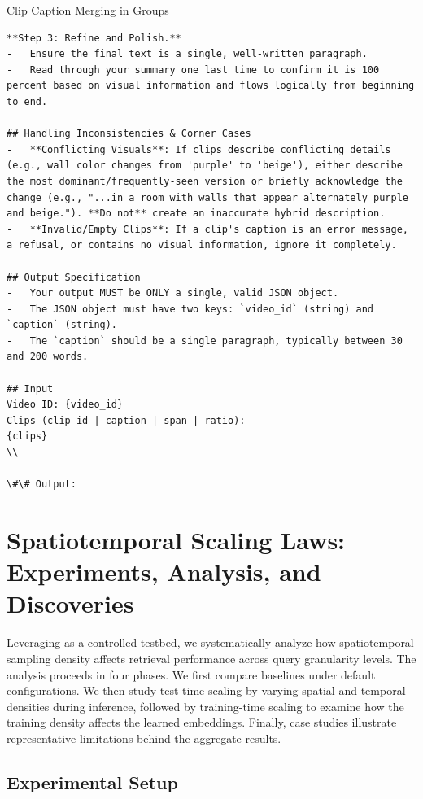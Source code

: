 \begin{promptbox}{Clip Caption Merging in Groups}
\begin{lstlisting}[style=promptstyle]
**Step 3: Refine and Polish.**
-   Ensure the final text is a single, well-written paragraph.
-   Read through your summary one last time to confirm it is 100 percent based on visual information and flows logically from beginning to end.

## Handling Inconsistencies & Corner Cases
-   **Conflicting Visuals**: If clips describe conflicting details (e.g., wall color changes from 'purple' to 'beige'), either describe the most dominant/frequently-seen version or briefly acknowledge the change (e.g., "...in a room with walls that appear alternately purple and beige."). **Do not** create an inaccurate hybrid description.
-   **Invalid/Empty Clips**: If a clip's caption is an error message, a refusal, or contains no visual information, ignore it completely.

## Output Specification
-   Your output MUST be ONLY a single, valid JSON object.
-   The JSON object must have two keys: `video_id` (string) and `caption` (string).
-   The `caption` should be a single paragraph, typically between 30 and 200 words.

## Input
Video ID: {video_id}
Clips (clip_id | caption | span | ratio):
{clips}
\\

\#\# Output:
\end{lstlisting}
\end{promptbox}

\FloatBarrier
\section{Spatiotemporal Scaling Laws: Experiments, Analysis, and Discoveries}
\label{mglvr:sec:scaling}

Leveraging \benchmarkname as a controlled testbed, we systematically analyze how spatiotemporal sampling density affects retrieval performance across query granularity levels. The analysis proceeds in four phases. We first compare baselines under default configurations. We then study test-time scaling by varying spatial and temporal densities during inference, followed by training-time scaling to examine how the training density affects the learned embeddings. Finally, case studies illustrate representative limitations behind the aggregate results.

\subsection{Experimental Setup}

